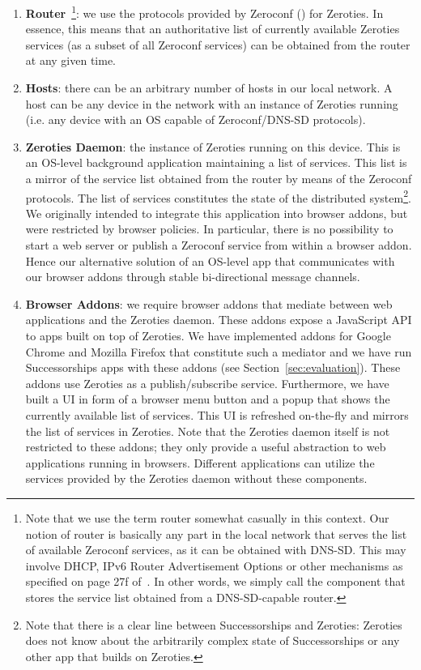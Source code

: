 \begin{enumerate}
\item \textbf{Router}~\footnote{Note that we use the term router somewhat casually in this context. Our notion of router is basically any part in the local network that serves the list of available Zeroconf services, as it can be obtained with DNS-SD. This may involve DHCP, IPv6 Router Advertisement Options or other mechanisms as specified on page 27f of~\cite{cheshire_2013_dnssd}. In other words, we simply call the component that stores the service list obtained from a DNS-SD-capable router.}: we use the protocols provided by Zeroconf (\cite{cheshire_2013_dnssd, cheshire_2013_mdns}) for Zeroties. 
In essence, this means that an authoritative list of currently available Zeroties services (as a subset of all Zeroconf services) can be obtained from the router at any given time.

\item \textbf{Hosts}: there can be an arbitrary number of hosts in our local network. A host can be any device in the network with an instance of Zeroties running (i.e. any device with an OS capable of Zeroconf/DNS-SD protocols).

\item \textbf{Zeroties Daemon}: the instance of Zeroties running on this device. 
This is an OS-level background application maintaining a list of services.
This list is a mirror of the service list obtained from the router by means of the Zeroconf protocols. 
The list of services constitutes the state of the distributed system\footnote{Note that there is a clear line between Successorships and Zeroties: Zeroties does not know about the arbitrarily complex state of Successorships or any other app that builds on Zeroties.}.
We originally intended to integrate this application into browser addons, but were restricted by browser policies.
In particular, there is no possibility to start a web server or publish a Zeroconf service from within a browser addon.
Hence our alternative solution of an OS-level app that communicates with our browser addons through stable bi-directional message channels.

\item \textbf{Browser Addons}: we require browser addons that mediate between web applications and the Zeroties daemon. These addons expose a JavaScript API to apps built on top of Zeroties.
We have implemented addons for Google Chrome and Mozilla Firefox that constitute such a mediator and we have run Successorships apps with these addons (see Section~\ref{sec:evaluation}).
These addons use Zeroties as a publish/subscribe service.
Furthermore, we have built a UI in form of a browser menu button and a popup that shows the currently available list of services.
This UI is refreshed on-the-fly and mirrors the list of services in Zeroties.
Note that the Zeroties daemon itself is not restricted to these addons; they only provide a useful abstraction to web applications running in browsers.
Different applications can utilize the services provided by the Zeroties daemon without these components.


\end{enumerate}
